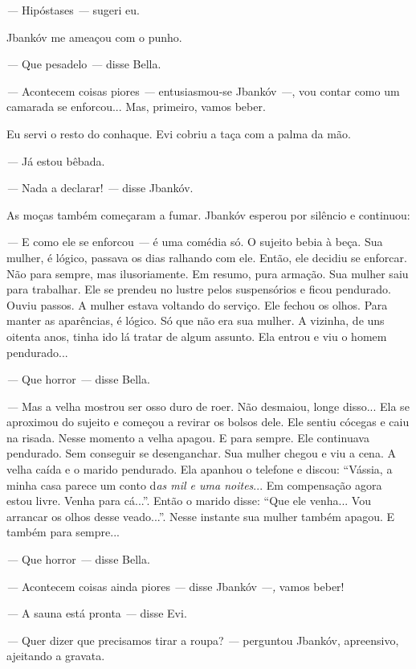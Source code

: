 \emph{---} Hipóstases \emph{---} sugeri eu.

Jbankóv me ameaçou com o punho.

\emph{---} Que pesadelo \emph{---} disse Bella.

\emph{---} Acontecem coisas piores \emph{---} entusiasmou-se Jbankóv
\emph{---}, vou contar como um camarada se enforcou... Mas, primeiro,
vamos beber.

Eu servi o resto do conhaque. Evi cobriu a taça com a palma da mão.

\emph{---} Já estou bêbada.

\emph{---} Nada a declarar! \emph{---} disse Jbankóv.

As moças também começaram a fumar. Jbankóv esperou por silêncio e
continuou:

\emph{---} E como ele se enforcou \emph{---} é uma comédia só. O sujeito
bebia à beça. Sua mulher, é lógico, passava os dias ralhando com ele.
Então, ele decidiu se enforcar. Não para sempre, mas ilusoriamente. Em
resumo, pura armação. Sua mulher saiu para trabalhar. Ele se prendeu no
lustre pelos suspensórios e ficou pendurado. Ouviu passos. A mulher
estava voltando do serviço. Ele fechou os olhos. Para manter as
aparências, é lógico. Só que não era sua mulher. A vizinha, de uns
oitenta anos, tinha ido lá tratar de algum assunto. Ela entrou e viu o
homem pendurado...

\emph{---} Que horror \emph{---} disse Bella.

\emph{---} Mas a velha mostrou ser osso duro de roer. Não desmaiou,
longe disso... Ela se aproximou do sujeito e começou a revirar os bolsos
dele. Ele sentiu cócegas e caiu na risada. Nesse momento a velha apagou.
E para sempre. Ele continuava pendurado. Sem conseguir se desenganchar.
Sua mulher chegou e viu a cena. A velha caída e o marido pendurado. Ela
apanhou o telefone e discou: ``Vássia, a minha casa parece um conto
d\emph{as mil e uma noites}... Em compensação agora estou livre. Venha
para cá...''. Então o marido disse: ``Que ele venha... Vou arrancar os
olhos desse veado...''. Nesse instante sua mulher também apagou. E
também para sempre...

\emph{---} Que horror \emph{---} disse Bella.

\emph{---} Acontecem coisas ainda piores \emph{---} disse Jbankóv
\emph{---,} vamos beber!

\emph{---} A sauna está pronta \emph{---} disse Evi.

\emph{---} Quer dizer que precisamos tirar a roupa? \emph{---} perguntou
Jbankóv, apreensivo, ajeitando a gravata.


